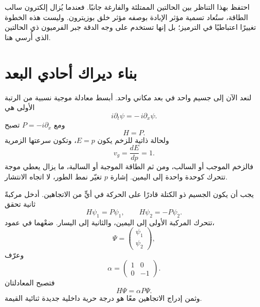 احتفظ بهذا التناظر بين الحالتين الممتلئة والفارغة جانبًا. فعندما يُزال إلكترون سالب الطاقة، ستُعاد تسمية مؤثر الإبادة بوصفه مؤثر خلق بوزيترون. وليست هذه الخطوة تغييرًا اعتباطيًا في الترميز؛ بل إنها تستخدم على وجه الدقة جبر الفرميون ذي الحالتين الذي أُرسي هنا.

\section{بناء ديراك أحادي البعد}

لنعد الآن إلى جسيم واحد في بعد مكاني واحد. أبسط معادلة موجية نسبية من الرتبة الأولى هي
\begin{equation}
i\partial_t\psi=-\,i\partial_x\psi.
\label{eq:l10-right-mover}
\end{equation}
ومع \(P=-i\partial_x\) تصبح
\begin{equation}
H=P.
\end{equation}
ولحالة ذاتية للزخم يكون \(E=p\)، وتكون سرعتها الزمرية
\begin{equation}
v_g=\frac{dE}{dp}=1.
\end{equation}
فالزخم الموجب أو السالب، ومن ثم الطاقة الموجبة أو السالبة، ما يزال يعطي موجة تتحرك كوحدة واحدة إلى اليمين. إشارة \(p\) تغيّر نمط الطور، لا اتجاه الانتشار.

يجب أن يكون الجسيم ذو الكتلة قادرًا على الحركة في أيٍّ من الاتجاهين. أدخل مركبةً ثانية تحقق
\begin{equation}
H\psi_1=P\psi_1,
\qquad
H\psi_2=-P\psi_2.
\label{eq:l10-two-directions}
\end{equation}
تتحرك المركبة الأولى إلى اليمين، والثانية إلى اليسار. ضعْهما في عمود،
\begin{equation}
\Psi=
\begin{pmatrix}
\psi_1\\
\psi_2
\end{pmatrix},
\end{equation}
وعرّف
\begin{equation}
\alpha=
\begin{pmatrix}
1&0\\
0&-1
\end{pmatrix}.
\end{equation}
فتصبح المعادلتان
\begin{equation}
H\Psi=\alpha P\Psi.
\label{eq:l10-massless-one-d}
\end{equation}
وثمن إدراج الاتجاهين معًا هو درجة حرية داخلية جديدة ثنائية القيمة.

